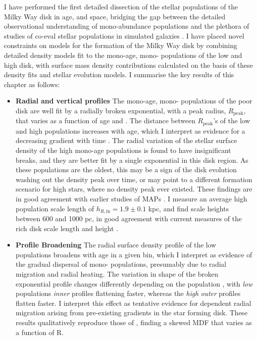 I have performed the first detailed dissection of the stellar populations of the Milky Way disk in age, \feh{} and \afe{} space, bridging the gap between the detailed observational understanding of mono-abundance populations \citep[e.g.][]{2012ApJ...753..148B,2016ApJ...823...30B} and the plethora of studies of co-eval stellar populations in simulated galaxies \citep[e.g][]{2013ApJ...773...43B,2014MNRAS.442.2474M,2013MNRAS.436..625S}. I have placed novel constraints on models for the formation of the Milky Way disk by combining detailed density models fit to the mono-age, mono-\feh{} populations of the low and high \afe{} disk, with surface mass density contributions calculated on the basis of these density fits and stellar evolution models. I summarise the key results of this chapter as follows:
\begin{itemize}
\item \textbf{Radial and vertical profiles} The mono-age, mono-\feh{} populations of the \afe{} poor disk are well fit by a radially broken exponential, with a peak radius, $R_{\mathrm{peak}}$, that varies as a function of age and \feh{}. The distance between $R_{\mathrm{peak}}$'s of the low and high \feh{} populations increases with age, which I interpret as evidence for a decreasing \feh{} gradient with time \citep[e.g][]{2016arXiv160804951A}. The radial variation of the stellar surface density of the high \afe{} mono-age populations is found to have insignificant breaks, and they are better fit by a single exponential in this disk region. As these populations are the oldest, this may be a sign of the disk evolution washing out the density peak over time, or may point to a different formation scenario for high \afe{} stars, where no density peak ever existed. These findings are in good agreement with earlier studies of MAPs \citep{2016ApJ...823...30B}. I measure an average high \afe{} population scale length of $h_{R,\text{in}} = 1.9 \pm 0.1$ kpc, and find scale heights between 600 and 1000 pc, in good agreement with current measures of the \afe{} rich disk scale length and height \citep[e.g. those outlined in][]{2016ARA&A..54..529B}. 
\item \textbf{Profile Broadening}  The radial surface density profile of the low \afe{} populations broadens with age in a given \feh{} bin, which I interpret as evidence of the gradual dispersal of mono-\feh{} populations, presumably due to radial migration and radial heating. The variation in shape of the broken exponential profile changes differently depending on the population \feh{}, with \emph{low} \feh{} populations \emph{inner} profiles flattening faster, whereas the \emph{high} \feh{} \emph{outer} profiles flatten faster. I interpret this effect as tentative evidence for \feh{} dependent radial migration arising from pre-existing \feh{} gradients in the star forming disk. These results qualitatively reproduce those of \citet{2015ApJ...808..132H}, finding a skewed MDF that varies as a function of R.

\end{itemize}

